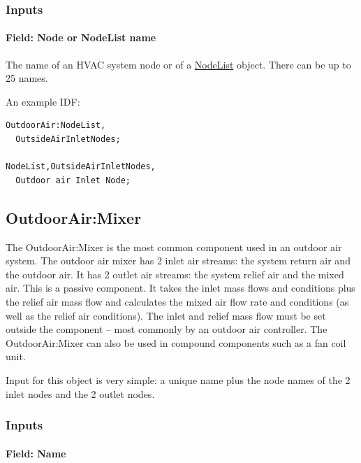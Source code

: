 \subsubsection{Inputs}\label{inputs-6-001}

\paragraph{Field: Node or NodeList name}\label{field-node-or-nodelist-name}

The name of an HVAC system node or of a \hyperref[nodelist]{NodeList} object. There can be up to 25 names.

An example IDF:

\begin{lstlisting}
OutdoorAir:NodeList,
  OutsideAirInletNodes;

NodeList,OutsideAirInletNodes,
  Outdoor air Inlet Node;
\end{lstlisting}

\subsection{OutdoorAir:Mixer}\label{outdoorairmixer}

The OutdoorAir:Mixer is the most common component used in an outdoor air system. The outdoor air mixer has 2 inlet air streams: the system return air and the outdoor air. It has 2 outlet air streams: the system relief air and the mixed air. This is a passive component. It takes the inlet mass flows and conditions plus the relief air mass flow and calculates the mixed air flow rate and conditions (as well as the relief air conditions). The inlet and relief mass flow must be set outside the component -- most commonly by an outdoor air controller. The OutdoorAir:Mixer can also be used in compound components such as a fan coil unit.

Input for this object is very simple: a unique name plus the node names of the 2 inlet nodes and the 2 outlet nodes.

\subsubsection{Inputs}\label{inputs-7-001}

\paragraph{Field: Name}\label{field-name-6-001}

